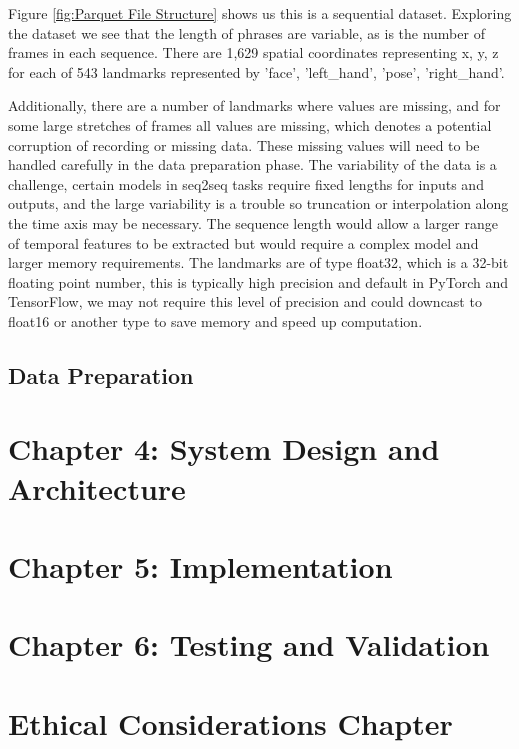 \documentclass[preprint,11pt,review,authoryear]{elsarticle}
\begin{document}
Figure \ref{fig:Parquet File Structure} shows us this is a sequential dataset. Exploring the dataset we see that the length of phrases are variable, as is the number of frames in each sequence. There are 1,629 spatial coordinates representing x, y, z for each of 543 landmarks represented by 'face', 'left_hand', 'pose', 'right_hand'. 

Additionally, there are a number of landmarks where values are missing, and for some large stretches of frames all values are missing, which denotes a potential corruption of recording or missing data. These missing values will need to be handled carefully in the data preparation phase. The variability of the data is a challenge, certain models in seq2seq tasks require fixed lengths for inputs and outputs, and the large variability is a trouble so truncation or interpolation along the time axis may be necessary. The sequence length would allow a larger range of temporal features to be extracted but would require a complex model and larger memory requirements.  The landmarks are of type float32, which is a 32-bit floating point number, this is typically high precision and default in PyTorch and TensorFlow, we may not require this level of precision and could downcast to float16 or another type to save memory and speed up computation.

\subsection{Data Preparation}



\section{Chapter 4: System Design and Architecture}



\section{Chapter 5: Implementation}


\newpage %
%
\section{Chapter 6: Testing and Validation}

\section{Ethical Considerations Chapter}
\end{document}
